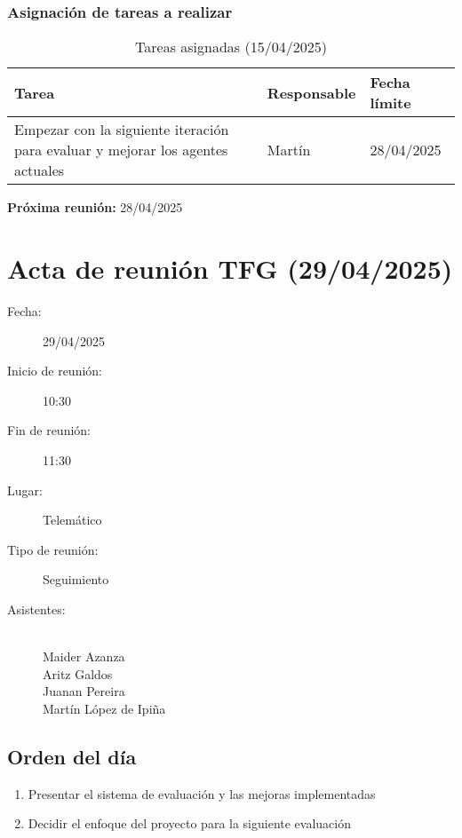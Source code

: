 \subsubsection{Asignación de tareas a realizar}
\begin{table}[h]
    \centering
    \begin{tabular}{|p{8cm}|p{3cm}|p{3cm}|}
        \hline
        \textbf{Tarea} & \textbf{Responsable} & \textbf{Fecha límite} \\
        \hline
        Empezar con la siguiente iteración para evaluar y mejorar los agentes actuales & Martín & 28/04/2025 \\
        \hline
    \end{tabular}
    \caption{Tareas asignadas (15/04/2025)}
\end{table}

\textbf{Próxima reunión:} 28/04/2025

\clearpage

\section{Acta de reunión TFG (29/04/2025)}

\begin{description}
    \item[Fecha:] 29/04/2025
    \item[Inicio de reunión:] 10:30
    \item[Fin de reunión:] 11:30
    \item[Lugar:] Telemático
    \item[Tipo de reunión:] Seguimiento
    \item[Asistentes:] ~\\
    Maider Azanza\\
    Aritz Galdos\\
    Juanan Pereira\\
    Martín López de Ipiña
\end{description}

\subsection{Orden del día}
\begin{enumerate}
    \item Presentar el sistema de evaluación y las mejoras implementadas
    \item Decidir el enfoque del proyecto para la siguiente evaluación
\end{enumerate}

